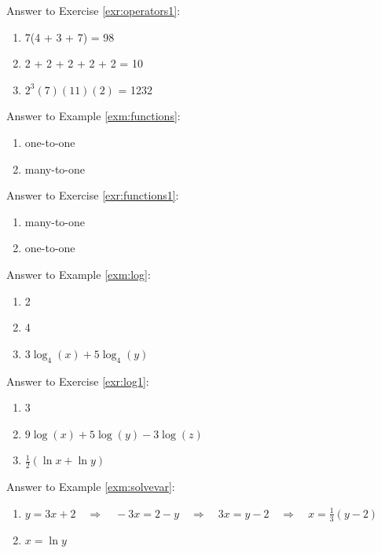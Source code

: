 \documentclass[]{book}
\theoremstyle{definition}
\theoremstyle{definition}
\theoremstyle{definition}
\theoremstyle{remark}
\begin{document}
Answer to Exercise \ref{exr:operators1}:

\begin{enumerate}
\def\labelenumi{\arabic{enumi}.}
\item
  7(4 + 3 + 7) = 98
\item
  2 + 2 + 2 + 2 + 2 = 10
\item
  \(2^3(7)(11)(2)\) = 1232
\end{enumerate}

Answer to Example \ref{exm:functions}:

\begin{enumerate}
\def\labelenumi{\arabic{enumi}.}
\item
  one-to-one
\item
  many-to-one
\end{enumerate}

Answer to Exercise \ref{exr:functions1}:

\begin{enumerate}
\def\labelenumi{\arabic{enumi}.}
\item
  many-to-one
\item
  one-to-one
\end{enumerate}

Answer to Example \ref{exm:log}:

\begin{enumerate}
\def\labelenumi{\arabic{enumi}.}
\item
  2
\item
  4
\item
  \(3\log_4(x) + 5\log_4(y)\)
\end{enumerate}

Answer to Exercise \ref{exr:log1}:

\begin{enumerate}
\def\labelenumi{\arabic{enumi}.}
\item
  3
\item
  \(9\log(x) + 5\log(y) - 3\log(z)\)
\item
  \(\frac{1}{2}(\ln{x} + \ln{y})\)
\end{enumerate}

Answer to Example \ref{exm:solvevar}:

\begin{enumerate}
\def\labelenumi{\arabic{enumi}.}
\item
  \(y=3x+2 \quad\Longrightarrow\quad -3x=2-y \quad\Longrightarrow\quad 3x=y-2 \quad\Longrightarrow\quad x=\frac{1}{3}(y-2)\)
\item
  \(x = \ln{y}\)
\end{enumerate}
\end{document}
